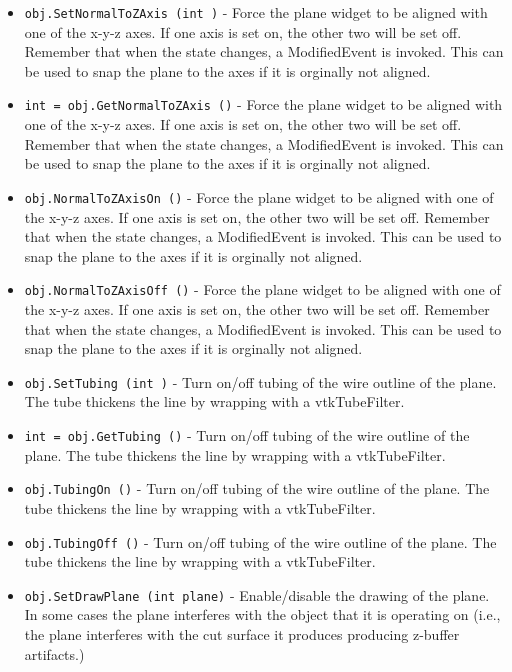 \begin{itemize}
\item  \verb|obj.SetNormalToZAxis (int )| -  Force the plane widget to be aligned with one of the x-y-z axes.
 If one axis is set on, the other two will be set off.
 Remember that when the state changes, a ModifiedEvent is invoked.
 This can be used to snap the plane to the axes if it is orginally
 not aligned.

\item  \verb|int = obj.GetNormalToZAxis ()| -  Force the plane widget to be aligned with one of the x-y-z axes.
 If one axis is set on, the other two will be set off.
 Remember that when the state changes, a ModifiedEvent is invoked.
 This can be used to snap the plane to the axes if it is orginally
 not aligned.

\item  \verb|obj.NormalToZAxisOn ()| -  Force the plane widget to be aligned with one of the x-y-z axes.
 If one axis is set on, the other two will be set off.
 Remember that when the state changes, a ModifiedEvent is invoked.
 This can be used to snap the plane to the axes if it is orginally
 not aligned.

\item  \verb|obj.NormalToZAxisOff ()| -  Force the plane widget to be aligned with one of the x-y-z axes.
 If one axis is set on, the other two will be set off.
 Remember that when the state changes, a ModifiedEvent is invoked.
 This can be used to snap the plane to the axes if it is orginally
 not aligned.

\item  \verb|obj.SetTubing (int )| -  Turn on/off tubing of the wire outline of the plane. The tube thickens
 the line by wrapping with a vtkTubeFilter.

\item  \verb|int = obj.GetTubing ()| -  Turn on/off tubing of the wire outline of the plane. The tube thickens
 the line by wrapping with a vtkTubeFilter.

\item  \verb|obj.TubingOn ()| -  Turn on/off tubing of the wire outline of the plane. The tube thickens
 the line by wrapping with a vtkTubeFilter.

\item  \verb|obj.TubingOff ()| -  Turn on/off tubing of the wire outline of the plane. The tube thickens
 the line by wrapping with a vtkTubeFilter.

\item  \verb|obj.SetDrawPlane (int plane)| -  Enable/disable the drawing of the plane. In some cases the plane
 interferes with the object that it is operating on (i.e., the
 plane interferes with the cut surface it produces producing
 z-buffer artifacts.)


\end{itemize}
